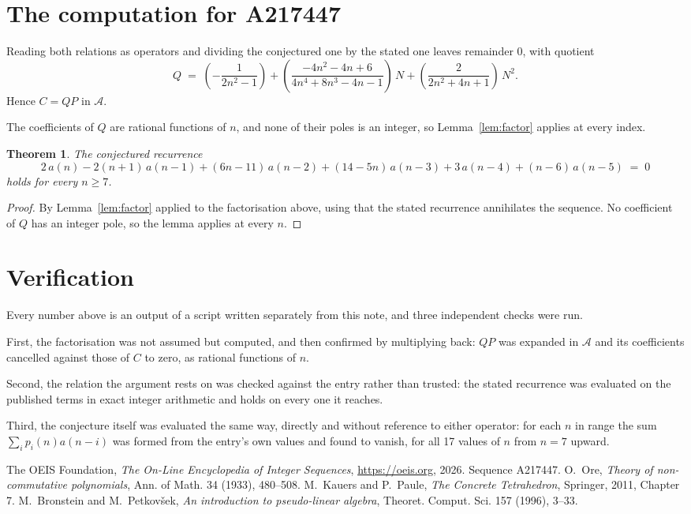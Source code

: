 \documentclass[11pt,a4paper]{article}
\theoremstyle{plain}
\newtheorem{theorem}{Theorem}
\theoremstyle{definition}
\begin{document}
\section{The computation for A217447}

Reading both relations as operators and dividing the conjectured one by the stated one
leaves remainder $0$, with quotient
\[
Q \;=\; \left(- \frac{1}{2 n^{2} - 1}\right) + \left(\frac{- 4 n^{2} - 4 n + 6}{4 n^{4} + 8 n^{3} - 4 n - 1}\right)\,N + \left(\frac{2}{2 n^{2} + 4 n + 1}\right)\,N^{2} .
\]
Hence $C=QP$ in $\mathcal{A}$.

The coefficients of $Q$ are rational functions of $n$, and none of their poles is an integer, so Lemma~\ref{lem:factor} applies at every index.

\begin{theorem}
The conjectured recurrence
\[
2\,a(n) -  2 \left(n + 1\right)\,a(n-1) + (6 n - 11)\,a(n-2) + (14 - 5 n)\,a(n-3) + 3\,a(n-4) + (n - 6)\,a(n-5) \;=\;0
\]
holds for every $n\ge7$.
\end{theorem}

\begin{proof}
By Lemma~\ref{lem:factor} applied to the factorisation above, using that the stated
recurrence annihilates the sequence. No coefficient of $Q$ has an integer pole, so the lemma applies at every $n$.
\end{proof}

\section{Verification}

Every number above is an output of a script written separately from this note, and three
independent checks were run.

First, the factorisation was not assumed but computed, and then confirmed by multiplying
back: $QP$ was expanded in $\mathcal{A}$ and its coefficients cancelled against those of
$C$ to zero, as rational functions of $n$.

Second, the relation the argument rests on was checked against the entry rather than
trusted: the stated recurrence was evaluated on the published terms in exact integer
arithmetic and holds on every one it reaches.

Third, the conjecture itself was evaluated the same way, directly and without reference to
either operator: for each $n$ in range the sum $\sum_{i}p_{i}(n)a(n-i)$ was formed from the
entry's own values and found to vanish, for all 17 values of $n$ from
$n=7$ upward.

\begin{thebibliography}{9}
 The OEIS Foundation, \emph{The On-Line Encyclopedia of Integer Sequences},
\url{https://oeis.org}, 2026. Sequence A217447.
 O.~Ore, \emph{Theory of non-commutative polynomials}, Ann. of Math. 34
(1933), 480--508.
 M.~Kauers and P.~Paule, \emph{The Concrete Tetrahedron}, Springer, 2011,
Chapter 7.
 M.~Bronstein and M.~Petkov\v{s}ek, \emph{An introduction to
pseudo-linear algebra}, Theoret. Comput. Sci. 157 (1996), 3--33.
\end{thebibliography}
\end{document}
